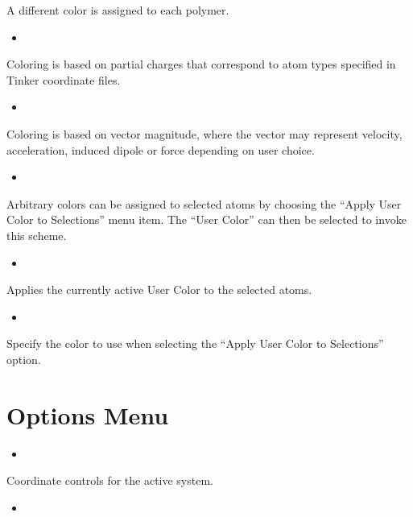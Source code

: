 \documentclass[letterpaper,11pt,english]{sphinxmanual}
\begin{document}
A different color is assigned to each polymer.
\begin{itemize}
\item {} 

\end{itemize}

Coloring is based on partial charges that correspond to atom types specified in Tinker coordinate files.
\begin{itemize}
\item {} 

\end{itemize}

Coloring is based on vector magnitude, where the vector may represent velocity, acceleration, induced dipole or force depending on user choice.
\begin{itemize}
\item {} 

\end{itemize}

Arbitrary colors can be assigned to selected atoms by choosing the “Apply User Color to Selections” menu item. The “User Color” can then be selected to invoke this scheme.
\begin{itemize}
\item {} 

\end{itemize}

Applies the currently active User Color to the selected atoms.
\begin{itemize}
\item {} 

\end{itemize}

Specify the color to use when selecting the “Apply User Color to Selections” option.


\section{Options Menu}
\label{\detokenize{text/menus:options-menu}}\begin{itemize}
\item {} 

\end{itemize}

Coordinate controls for the active system.
\begin{itemize}
\item {} 

\end{itemize}
\end{document}
